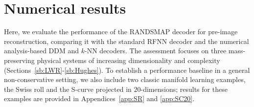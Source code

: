 \documentclass{article}
\begin{document}

\section{Numerical results}\label{sec:numerics}
Here, we evaluate the performance of the RANDSMAP decoder for pre-image reconstruction, comparing it with the standard RFNN decoder and the numerical analysis-based DDM and $k$-NN decoders. The assessment focuses on three mass-preserving physical systems of increasing dimensionality and complexity (Sections~\ref{sb:LWR}-\ref{sb:Hughes}). 
To establish a performance baseline in a general non-conservative setting, we also include two classic manifold learning examples, the Swiss roll and the S-curve projected in $20$-dimensions; results for these examples are provided in Appendices~\ref{app:SR} and \ref{app:SC20}.
\end{document}
